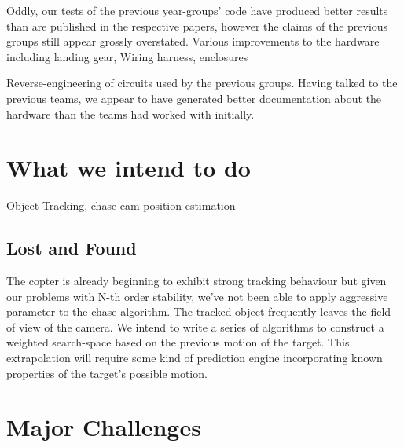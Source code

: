 \documentclass[11pt]{article}
\begin{document}
    Oddly, our tests of the previous year-groups' code have produced better results than are published in the respective papers, however the claims of the previous groups still appear grossly overstated.
    Various improvements to the hardware including landing gear, Wiring harness, enclosures

    Reverse-engineering of circuits used by the previous groups. Having talked to the previous teams, we appear to have generated better documentation about the hardware than the teams had worked with initially.


  \section{What we intend to do}
    Object Tracking, chase-cam
    position estimation

    \subsection{Lost and Found}
      The copter is already beginning to exhibit strong tracking behaviour but given our problems with N-th order stability, we've not been able to apply aggressive parameter to the chase algorithm.  The tracked object frequently leaves the field of view of the camera.
      We intend to write a series of algorithms to construct a weighted search-space based on the previous motion of the target.  This extrapolation will require some kind of prediction engine incorporating known properties of the target's possible motion. 


  \section{Major Challenges}
\end{document}
